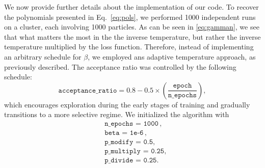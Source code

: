 \documentclass[11pt]{article}
\begin{document}
We now provide further details about the implementation of our code. To recover the polynomials presented in Eq.~\eqref{eq:pols}, we performed 1000 independent runs on a cluster, each involving 1000 particles. As can be seen in \eqref{eq:gamman}, we see that what matters the most in the the inverse temperature, but rather the inverse temperature multiplied by the loss function. Therefore, instead of implementing an arbitrary schedule for $\beta$, we employed ans adaptive temperature approach, as previously described. The acceptance ratio was controlled by the following schedule:
\begin{equation}
	\texttt{acceptance\_ratio} = 0.8 - 0.5 \times \left(\frac{\texttt{epoch}}{\texttt{n\_epochs}}\right),
\end{equation}
which encourages exploration during the early stages of training and gradually transitions to a more selective regime. We initialized the algorithm with 
\begin{equation}\label{eq:sample10000adaptativetemp}
	\begin{aligned}
		&\texttt{n\_epochs = 1000}\,,\\
		&\texttt{beta = 1e{-6}}\,, \\
		&\texttt{p\_{modify} = 0.5},\\
		&\texttt{p\_{multiply} = 0.25},\\
		&\texttt{p\_{divide} = 0.25}. 
	\end{aligned}
\end{equation}
\end{document}

